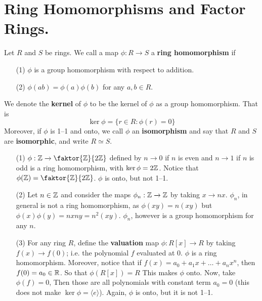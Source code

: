 
\section{Ring Homomorphisms and Factor Rings.}

\begin{definition}
    Let $R$ and  $S$ be rings. We call a map  $\phi:R \xrightarrow{} S$ a
    \textbf{ring homomorphism} if
    \begin{enumerate}
        \item[(1)] $\phi$ is a group homomorphism with respect to addition.

        \item[(2)] $\phi(ab)=\phi(a)\phi(b)$ for any $a,b \in R$.
    \end{enumerate}
    We denote the \textbf{kernel} of $\phi$ to be the kernel of $\phi$ as a
    group homomorphism. That is
    \begin{equation*}
        \ker{\phi}=\{r \in R : \phi(r)=0\}
    \end{equation*}
    Moreover, if $\phi$ is 1--1 and onto, we call $\phi$ an \textbf{isomorphism}
    and say that $R$ and $S$ are \textbf{isomorphic}, and write $R \simeq S$.
\end{definition}

\begin{example}\label{1.9}
    \begin{enumerate}
        \item[(1)] $\phi:\Z \xrightarrow{} \faktor{\Z}{2\Z}$ defined by $n
            \xrightarrow{} 0$ if $n$ is even and  $n \xrightarrow{} 1$ if $n$ is
            odd is a ring homomorphism, with  $\ker{\phi}=2\mathbb{Z}$. Notice that
            $\phi(\Z)=\faktor{\Z}{2\Z}$. $\phi$ is onto, but not 1--1.

        \item[(2)] Let $n \in \mathbb{Z}$ and consider the maps  $\phi_n:\mathbb{Z}
            \xrightarrow{} \mathbb{Z}$ by taking $x \xrightarrow{} nx$. $\phi_n$, in
            general is not a ring homomorphism, as  $\phi(xy)=n(xy)$ but
            $\phi(x)\phi(y)=nxny=n^2(xy)$. $\phi_n$, however is a group
            homomorphism for any $n$.

        \item[(3)] For any ring $R$, define the \textbf{valuation} map
            $\phi:R[x] \xrightarrow{} R$ by taking $f(x) \xrightarrow{} f(0)$;
            i.e. the polynomial $f$ evaluated at $0$.  $\phi$ is a ring
            homomorphism. Moreover, notice that if
            $f(x)=a_0+a_1x+\dots+a_nx^n$, then $f(0)=a_0 \in \mathbb{R}$. So that
            $\phi(R[x])=R$ This makes $\phi$ onto. Now, take  $\phi(f)=0$, Then
            those are all polynomials with constant term $a_0=0$ (this does not
            make $\ker{\phi}=\langle e \rangle$). Again, $\phi$ is onto, but it
            is not 1--1.
    \end{enumerate}
\end{example}

